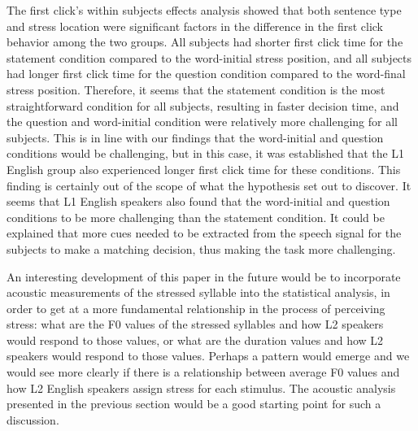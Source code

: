 \documentclass[a4paper]{article}
\begin{document}
The first click's within subjects effects analysis showed that both sentence type and stress location were significant factors in the difference in the first click behavior among the two groups. All subjects had shorter first click time for the statement condition compared to the word-initial stress position, and all subjects had longer first click time for the question condition compared to the word-final stress position. Therefore, it seems that the statement condition is the most straightforward condition for all subjects, resulting in faster decision time, and the question and word-initial condition were relatively more challenging for all subjects. This is in line with our findings that the word-initial and question conditions would be challenging, but in this case, it was established that the L1 English group also experienced longer first click time for these conditions. This finding is certainly out of the scope of what the hypothesis set out to discover. It seems that L1 English speakers also found that the word-initial and question conditions to be more challenging than the statement condition. It could be explained that more cues needed to be extracted from the speech signal for the subjects to make a matching decision, thus making the task more challenging.


An interesting development of this paper in the future would be to incorporate acoustic measurements of the stressed syllable into the statistical analysis, in order to get at a more fundamental relationship in the process of perceiving stress: what are the F0 values of the stressed syllables and how L2 speakers would respond to those values, or what are the duration values and how L2 speakers would respond to those values. Perhaps a pattern would emerge and we would see more clearly if there is a relationship between average F0 values and how L2 English speakers assign stress for each stimulus. The acoustic analysis presented in the previous section would be a good starting point for such a discussion.
\end{document}
